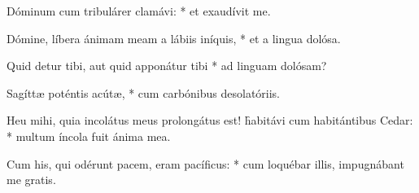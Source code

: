 \begin{psalmus}

 Dóminum cum tribulárer clamávi: * et exaudívit me.

Dómine, líbera ánimam meam a lábiis iníquis, * et a lingua dolósa.

Quid detur tibi, aut quid apponátur tibi * ad linguam dolósam?

Sagíttæ poténtis acútæ, * cum carbónibus desolatóriis.

Heu mihi, quia incolátus meus prolongátus est! \f habitávi cum habitántibus Cedar: * multum íncola fuit ánima mea.

Cum his, qui odérunt pacem, eram pacíficus: * cum loquébar illis, impugnábant me gratis.

\end{psalmus}
